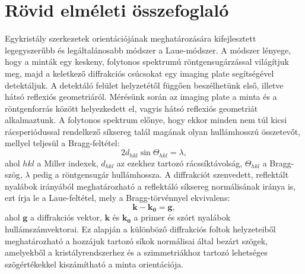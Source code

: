 \documentclass[12pt,a4paper]{article}
\begin{document}
\section{Rövid elméleti összefoglaló}
\hspace*{10pt} Egykristály szerkezetek orientációjának meghatározására kifejlesztett legegyszerűbb és legáltalánosabb módszer a Laue-módszer. A módszer lényege, hogy a minták egy keskeny, folytonos spektrumú röntgensugárzással világítjuk meg, majd a keletkező diffrakciós csúcsokat egy imaging plate segítségével detektáljuk. A detektáló felület helyzetétől függően beszélhetünk első, illetve hátsó reflexiós geometriáról. Mérésünk során az imaging plate a minta és a röntgenforrás között helyezkedett el, vagyis hátsó reflexiós geometriát alkalmaztunk. A folytonos spektrum előnye, hogy ekkor minden nem túl kicsi rácsperiódussal rendelkező síksereg talál magának olyan hullámhosszú összetevőt, mellyel teljesül a Bragg-feltétel:
\begin{equation}
2d_{hkl}\sin\Theta_{hkl}=\lambda,
\end{equation}
ahol $hkl$ a Miller indexek, $d_{hkl}$ az ezekhez tartozó rácssíktávolság, $\Theta_{hkl}$ a Bragg-szög, $\lambda$ pedig a röntgensugár hullámhossza. A diffrakciót szenvedett, reflektált nyalábok irányából meghatározható a reflektáló síksereg normálisának iránya is, ezt írja le a Laue-feltétel, mely a Bragg-törvénnyel ekvivalens:
\begin{equation}
\mathbf{k}-\mathbf{k_0}=\mathbf{g},
\end{equation}
ahol $\mathbf{g}$ a diffrakciós vektor, $\mathbf{k}$ és $\mathbf{k_0}$ a primer és szórt nyalábok hullámszámvektorai. Ez alapján a különböző diffrakciós foltok helyzeteiből meghatározható a hozzájuk tartozó síkok normálisai által bezárt szögek, amelyekből a kristályrendszerhez és a szimmetriákhoz tartozó lehetséges szögértékekkel kiszámítható a minta orientációja.
\end{document}

